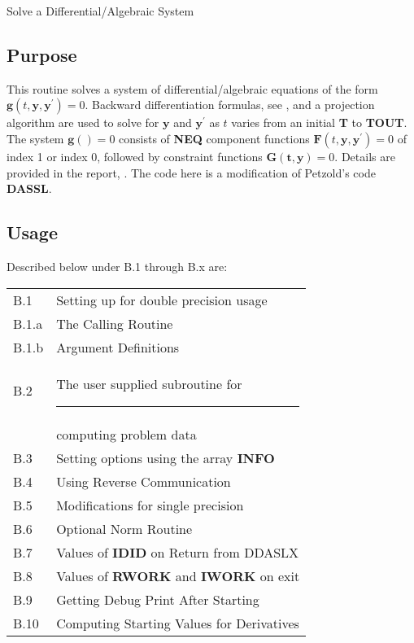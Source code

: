 \documentclass[twoside]{MATH77}
\begin{document}
 Solve a Differential/Algebraic System

\subsection{Purpose}
This routine solves a system of differential/algebraic equations of
the form $\mathbf{g}(t,\mathbf{y},\mathbf{y}^{\prime})=0.$ Backward
differentiation formulas, see \cite{Brenan:1996:DAE}, and a projection
algorithm are used to solve for $\mathbf{y}$ and $\mathbf{y}^{\prime}$
as $t$ varies from an initial \textbf{T} to \textbf{TOUT}.  The system
$\mathbf{g()}=0$ consists of \textbf{NEQ} component functions
$\mathbf{F}(t,\mathbf{y},\mathbf{y}^{\prime})=0$ of index 1 or index
0, followed by constraint functions $\mathbf{G(t,y)}=0.$ Details are
provided in the report, \cite{Hanson:2008:DAS}.
The code here is a modification of Petzold's code \textbf{DASSL}.


\subsection{Usage}

Described below under B.1 through B.x are:

\begin{tabular*}{3.3in}{@{}l@{~~}l}
  B.1 & \hspace{-20pt} Setting up for double precision usage\dotfill
  \pageref{PPSP}\\
  \quad B.1.a & The Calling Routine\dotfill \pageref{Calling}\\
  \quad B.1.b & Argument Definitions\dotfill \pageref{ArgDefs}\\
  B.2 & \hspace{-20pt} The user supplied subroutine for\rule{.9in}{0pt}\\
  & computing problem data\dotfill \pageref{DDASF}\\
  B.3 & \hspace{-20pt} Setting options using the array \textbf{INFO}\dotfill
  \pageref{INFO}\\
  B.4 & \hspace{-20pt} Using Reverse Communication\dotfill \pageref{revcom}\\
  B.5 & \hspace{-20pt} Modifications for single precision\dotfill
  \pageref{Sngl}\\
  B.6 & \hspace{-20pt} Optional Norm Routine\dotfill
  \pageref{NORM}\\
  B.7 & \hspace{-20pt} Values of \textbf{IDID} on Return from DDASLX\dotfill
  \pageref{IDID_vals}\\
  B.8 & \hspace{-20pt} Values of \textbf{RWORK} and \textbf{IWORK} on
  exit\dotfill\pageref{WORKS_val}\\
  B.9 & \hspace{-20pt} Getting Debug Print After Starting\dotfill\pageref{debug}\\
  B.10 & \hspace{-20pt} Computing Starting Values for Derivatives
  \dotfill \pageref{starting} 
\end{tabular*}
\end{document}
